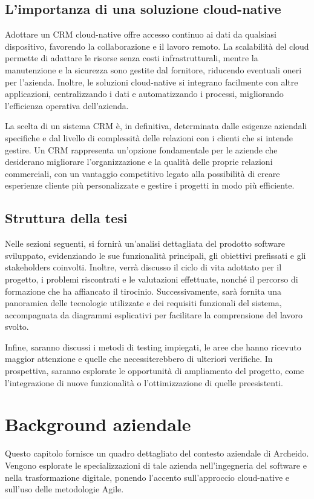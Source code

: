 \documentclass[target=bach,aauheader=,style=]{thud}
\begin{document}
\section{L'importanza di una soluzione cloud-native}
Adottare un CRM cloud-native\cite{sam_solutions_cloud} offre accesso continuo ai dati da qualsiasi dispositivo, favorendo la collaborazione e il lavoro remoto. La scalabilità del cloud permette di adattare le risorse senza costi infrastrutturali, mentre la manutenzione e la sicurezza sono gestite dal fornitore, riducendo eventuali oneri per l'azienda. Inoltre, le soluzioni cloud-native si integrano facilmente con altre applicazioni, centralizzando i dati e automatizzando i processi, migliorando l'efficienza operativa dell'azienda.

\noindent La scelta di un sistema CRM è, in definitiva, determinata dalle esigenze aziendali specifiche e dal livello di complessità delle relazioni con i clienti che si intende gestire. Un CRM rappresenta un'opzione fondamentale per le aziende che desiderano migliorare l'organizzazione e la qualità delle proprie relazioni commerciali, con un vantaggio competitivo legato alla possibilità di creare esperienze cliente più personalizzate e gestire i progetti in modo più efficiente.

\section{Struttura della tesi}

Nelle sezioni seguenti, si fornirà un'analisi dettagliata del prodotto software sviluppato, evidenziando le sue funzionalità principali, gli obiettivi prefissati e gli stakeholders coinvolti. Inoltre, verrà discusso il ciclo di vita adottato per il progetto, i problemi riscontrati e le valutazioni effettuate, nonché il percorso di formazione che ha affiancato il tirocinio. Successivamente, sarà fornita una panoramica delle tecnologie utilizzate e dei requisiti funzionali del sistema, accompagnata da diagrammi esplicativi per facilitare la comprensione del lavoro svolto. 

\noindent Infine, saranno discussi i metodi di testing impiegati, le aree che hanno ricevuto maggior attenzione e quelle che necessiterebbero di ulteriori verifiche. In prospettiva, saranno esplorate le opportunità di ampliamento del progetto, come l'integrazione di nuove funzionalità o l'ottimizzazione di quelle preesistenti. 

\chapter{Background aziendale}
Questo capitolo fornisce un quadro dettagliato del contesto aziendale di Archeido. Vengono esplorate le specializzazioni di tale azienda nell'ingegneria del software e nella trasformazione digitale, ponendo l'accento sull'approccio cloud-native e sull'uso delle metodologie Agile.
\end{document}
